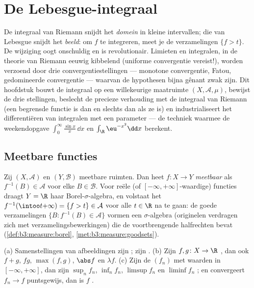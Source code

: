 \chapter{De Lebesgue-integraal}\label{ch:b3:lebesgue}

De integraal van Riemann snijdt het \emph{domein} in kleine
intervallen; die van Lebesgue snijdt het \emph{beeld}: om $f$ te
integreren, meet je de verzamelingen $\{f > t\}$. De wijziging
oogt onschuldig en is revolutionair. Limieten en integralen, in de
theorie van Riemann eeuwig kibbelend (uniforme convergentie
vereist!), worden verzoend door drie convergentiestellingen ---
monotone convergentie, Fatou, gedomineerde convergentie ---
waarvan de hypothesen bijna gênant zwak zijn. Dit hoofdstuk bouwt
de integraal op een willekeurige maatruimte $(X, \mathcal A,
\mu)$, bewijst de drie stellingen, beslecht de precieze
verhouding met de integraal van Riemann (een begrensde functie is
 dan en slechts dan als ze 
 is) en industrialiseert het differentiëren van integralen
met een parameter --- de techniek waarmee de weekendopgave
$\int_0^\infty\frac{\sin x}x\,\dd x$ en $\int_\R \eu^{-x^2}\dd x$
berekent.

\section{Meetbare functies}

\begin{definition}\label{def:b3:lebesgue:measurable}
Zij $(X, \mathcal A)$ en $(Y, \mathcal B)$ meetbare ruimten. Dan
heet $f \colon X \to Y$ \emph{meetbaar}
als $f^{-1}(B) \in \mathcal A$ voor elke $B \in \mathcal B$. Voor
reële (of $[-\infty,+\infty]$-waardige) functies draagt $Y = \R$
haar Borel-$\sigma$-algebra, en volstaat het $f^{-1}(\intoo
t{+\infty}) = \{f > t\} \in \mathcal A$ voor alle $t \in \R$ na te
gaan: de goede verzamelingen $\{B : f^{-1}(B) \in \mathcal A\}$
vormen een $\sigma$-algebra (originelen verdragen zich met
verzamelingsbewerkingen) die de voortbrengende halfrechten bevat
(\cref{def:b3:measure:borel},
\cref{met:b3:measure:goodsets}).
\end{definition}

\begin{proposition}\label{prop:b3:lebesgue:stability}
(a) Samenstellingen van  afbeeldingen zijn ;
 zijn .
(b) Zijn $f, g \colon X \to \R$ , dan ook $f + g$, $fg$,
$\max(f,g)$, $\abs f$ en $\lambda f$.
(c) Zijn de $(f_n)$  met waarden in $[-\infty, +\infty]$,
dan zijn $\sup_nf_n$, $\inf_nf_n$, $\limsup f_n$ en $\liminf f_n$
; en convergeert $f_n \to f$ puntsgewijs, dan is $f$
.
\end{proposition}

